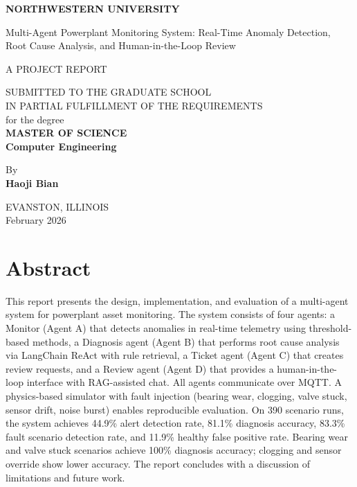 \documentclass[12pt,letterpaper]{report}
\begin{document}
\thispagestyle{empty}
\begin{center}
\vspace*{0.75in}
{\Large \textbf{NORTHWESTERN UNIVERSITY}}

\vspace{1in}
{\Large Multi-Agent Powerplant Monitoring System: Real-Time Anomaly Detection, Root Cause Analysis, and Human-in-the-Loop Review}

\vspace{0.75in}
{\large A PROJECT REPORT}

\vspace{0.4in}
SUBMITTED TO THE GRADUATE SCHOOL\\
IN PARTIAL FULFILLMENT OF THE REQUIREMENTS\\
for the degree\\
\textbf{MASTER OF SCIENCE}\\
\textbf{Computer Engineering}

\vspace{0.75in}
By\\
\textbf{Haoji Bian}

\vspace{0.75in}
EVANSTON, ILLINOIS\\
February 2026
\end{center}
\newpage

\setcounter{page}{2}
\chapter*{Abstract}

This report presents the design, implementation, and evaluation of a multi-agent system for powerplant asset monitoring. The system consists of four agents: a Monitor (Agent A) that detects anomalies in real-time telemetry using threshold-based methods, a Diagnosis agent (Agent B) that performs root cause analysis via LangChain ReAct with rule retrieval, a Ticket agent (Agent C) that creates review requests, and a Review agent (Agent D) that provides a human-in-the-loop interface with RAG-assisted chat. All agents communicate over MQTT. A physics-based simulator with fault injection (bearing wear, clogging, valve stuck, sensor drift, noise burst) enables reproducible evaluation. On 390 scenario runs, the system achieves 44.9\% alert detection rate, 81.1\% diagnosis accuracy, 83.3\% fault scenario detection rate, and 11.9\% healthy false positive rate. Bearing wear and valve stuck scenarios achieve 100\% diagnosis accuracy; clogging and sensor override show lower accuracy. The report concludes with a discussion of limitations and future work.
\end{document}
